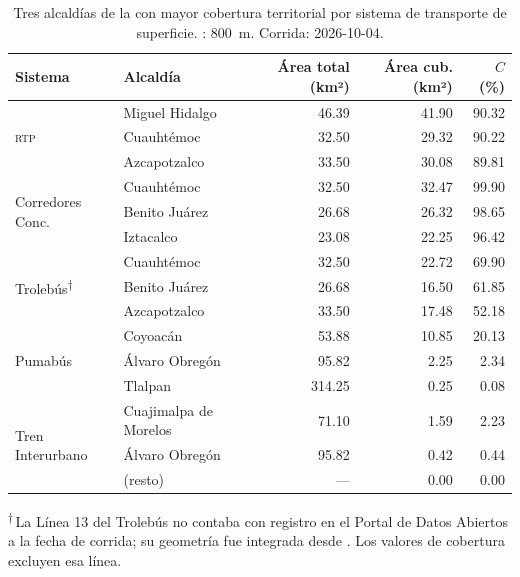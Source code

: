 \begin{table}[H]
    \centering
    \caption[Cobertura territorial — transporte de superficie, top 3 por alcaldía]{
    Tres alcaldías de la \cdmx{} con mayor cobertura territorial por sistema
    de transporte de superficie. : 800~m. Corrida: 2026-10-04.}
    \label{tab:cobertura-superficie}
    \fontsize{8.5pt}{10.5pt}\selectfont
    \begin{tabularx}{\textwidth}{|l|X|r|r|r|}
        \hline
        \textbf{Sistema} & \textbf{Alcaldía} &
        \textbf{Área total (km²)} & \textbf{Área cub. (km²)} &
        \textbf{$C$ (\%)} \\
        \hline
        \multirow{3}{*}{\textsc{rtp}}
            & Miguel Hidalgo    & 46.39 & 41.90 & 90.32 \\
            & Cuauhtémoc        & 32.50 & 29.32 & 90.22 \\
            & Azcapotzalco      & 33.50 & 30.08 & 89.81 \\
        \hline
        \multirow{3}{*}{Corredores Conc.}
            & Cuauhtémoc          & 32.50 & 32.47 & 99.90 \\
            & Benito Juárez       & 26.68 & 26.32 & 98.65 \\
            & Iztacalco           & 23.08 & 22.25 & 96.42 \\
        \hline
        \multirow{3}{*}{Trolebús\textsuperscript{†}}
            & Cuauhtémoc    & 32.50 & 22.72 & 69.90 \\
            & Benito Juárez & 26.68 & 16.50 & 61.85 \\
            & Azcapotzalco  & 33.50 & 17.48 & 52.18 \\
        \hline
        \multirow{3}{*}{Pumabús}
            & Coyoacán      &  53.88 & 10.85 & 20.13 \\
            & Álvaro Obregón &  95.82 &  2.25 &  2.34 \\
            & Tlalpan        & 314.25 &  0.25 &  0.08 \\
        \hline
        \multirow{3}{*}{Tren Interurbano}
            & Cuajimalpa de Morelos &  71.10 & 1.59 & 2.23 \\
            & Álvaro Obregón        &  95.82 & 0.42 & 0.44 \\
            & (resto)               &   ---  & 0.00 & 0.00 \\
        \hline
    \end{tabularx}
    \vspace{0.4em}

    \noindent\textsuperscript{†}\,La Línea 13 del Trolebús no contaba con
    registro en el Portal de Datos Abiertos a la fecha de corrida; su
    geometría fue integrada desde 
    \citep{osm2012}. Los valores de cobertura excluyen esa línea.

\end{table}

